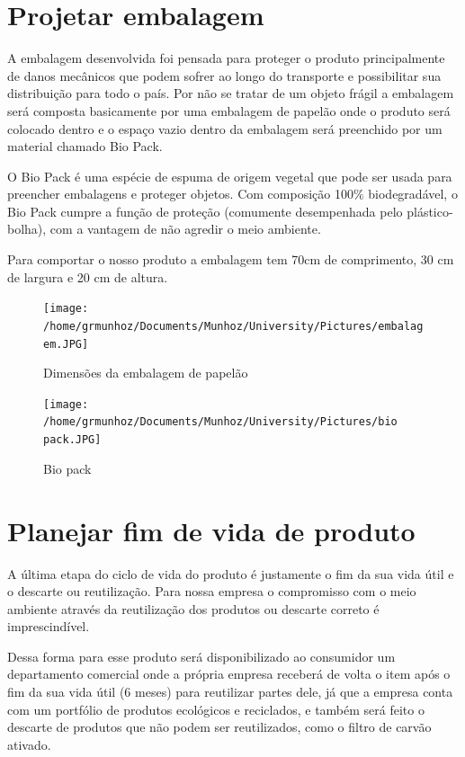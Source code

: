 \documentclass[
	12pt,				%
	openright,			%
	oneside,			%
	a4paper,			%
	english,			%
	french,				%
	spanish,			%
	brazil				%
	]{abntex2}
\begin{document}
\section{Projetar embalagem}

A embalagem desenvolvida foi pensada para proteger o produto principalmente de danos mecânicos que podem sofrer ao longo do transporte e possibilitar sua distribuição para todo o país. Por não se tratar de um objeto frágil a embalagem será composta basicamente por uma embalagem de papelão onde o produto será colocado dentro e o espaço vazio dentro da embalagem será preenchido por um material chamado Bio Pack.

O Bio Pack é uma espécie de espuma de origem vegetal que pode ser usada para preencher embalagens e proteger objetos. Com composição 100$\%$ biodegradável, o Bio Pack cumpre a função de proteção (comumente desempenhada pelo plástico-bolha), com a vantagem de não agredir o meio ambiente.

Para comportar o nosso produto a embalagem tem 70cm de comprimento, 30 cm de largura e 20 cm de altura.

\begin{figure}[H]
\begin{center}
\caption{Dimensões da embalagem de papelão}
\texttt{[image: /home/grmunhoz/Documents/Munhoz/University/Pictures/embalagem.JPG]} 
\label{figetapas}
\end{center}
\end{figure}

\begin{figure}[H]
\begin{center}
\caption{Bio pack}
\texttt{[image: /home/grmunhoz/Documents/Munhoz/University/Pictures/bio pack.JPG]} 
\label{figetapas}
\end{center}
\end{figure}


\section{Planejar fim de vida de produto}

A última etapa do ciclo de vida do produto é justamente o fim da sua vida útil e o descarte ou reutilização. Para nossa empresa o compromisso com o meio ambiente através da reutilização dos produtos ou descarte correto é imprescindível.

Dessa forma para esse produto será disponibilizado ao consumidor um departamento comercial onde a própria empresa receberá de volta o item após o fim da sua vida útil (6 meses) para reutilizar partes dele, já que a empresa conta com um portfólio de produtos ecológicos e reciclados, e também será feito o descarte de produtos que não podem ser reutilizados, como o filtro de carvão ativado.
\end{document}
